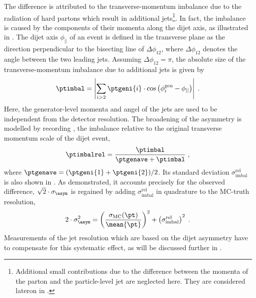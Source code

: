 The difference is attributed to the transverse-momentum imbalance due to the radiation of hard partons which result in additional jets\footnote{Additional small contributions due to the difference between the momenta of the parton and the particle-level jet are neglected here. They are considered lateron in .}.
In fact, the imbalance is caused by the components of their momenta along the dijet axis, as illustrated in .
The dijet axis $\phi_{||}$ of an event is defined in the transverse plane as the direction perpendicular to the bisecting line of $\Delta\phi_{12}$, where $\Delta\phi_{12}$ denotes the angle between the two leading jets.
Assuming \mbox{$\Delta\phi_{12} = \pi$}, the absolute size \ptimbal of the transverse-momentum imbalance due to additional jets is given by
\begin{equation*}
  \ptimbal = \left|\sum_{i>2}\ptgeni{i}\cdot\cos\left(\phi^{\text{gen}}_{i}-\phi_{||}\right)\right| \;.
\end{equation*}
Here, the generator-level momenta and angel of the jets are used to be independent from the detector resolution.
The broadening of the asymmetry is modelled by recording \ptimbalrel, the imbalance relative to the original transverse momentum scale of the dijet event,
\begin{equation}
  \label{eq:Jets:Resolution:Asymmetry:PtImbal}
  \ptimbalrel = \frac{\ptimbal}{\ptgenave + \ptimbal} \;,
\end{equation}
where \mbox{$\ptgenave = (\ptgeni{1}+\ptgeni{2})/2$}.
Its standard deviation $\sigma^{\text{rel}}_{\text{imbal}}$ is also shown in .
As demonstrated, it accounts precisely for the observed difference, \ie \mbox{$\sqrt{2}\cdot\sigma_{\asym}$} is regained by adding $\sigma^{\text{rel}}_{\text{imbal}}$ in quadrature to the MC-truth resolution,
\begin{equation*}
  2\cdot\sigma^{2}_{\asym} = \left(\frac{\sigma_{\text{MC}}(\pt)}{\mean{\pt}}\right)^{2} + \left(\sigma^{\text{rel}}_{\text{imbal}}\right)^{2} \;.
\end{equation*}
Measurements of the jet resolution which are based on the dijet asymmetry have to compensate for this systematic effect, as will be discussed further in .


\cleardoublepage
